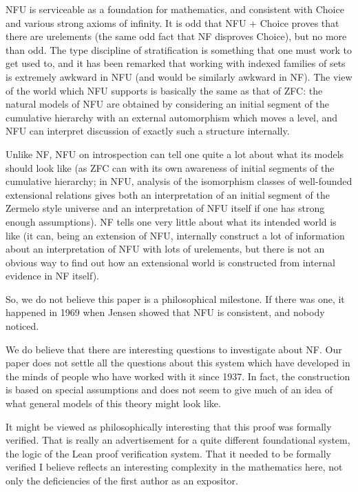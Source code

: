 \documentclass{article}
\theoremstyle{definition}
\theoremstyle{remark}
\begin{document}
NFU is serviceable as a foundation for mathematics, and consistent with Choice and various strong axioms of infinity.  It is odd that NFU + Choice proves that there are urelements (the same odd fact that NF disproves Choice), but no more than odd.
The type discipline of stratification is something that one must work to get used to, and it has been remarked that working with indexed families of sets is extremely awkward in NFU (and would be similarly awkward in NF).  The view of the world which NFU supports is basically the same as that of ZFC:  the natural models of NFU are obtained by considering an initial segment of the cumulative hierarchy with an external automorphism which moves a level, and NFU can interpret discussion of exactly such a structure internally.

Unlike NF, NFU on introspection can tell one quite a lot about what its models should look like (as ZFC can with its own awareness of initial segments of the cumulative hierarchy; in NFU, analysis of the isomorphism classes of well-founded extensional relations gives both an interpretation of an initial segment of the Zermelo style universe and an interpretation of NFU itself if one has strong enough assumptions).    NF tells one very little about what its intended world is like (it can, being an extension of NFU, internally construct a lot of information about an interpretation of NFU with lots of urelements, but there is not an obvious way to find out how an extensional world is constructed from internal evidence in NF itself).

So, we do not believe this paper is a philosophical milestone.  If there was one, it happened in 1969 when Jensen showed that NFU is consistent, and nobody noticed.

We do believe that there are interesting questions to investigate about NF.  Our paper does not settle all the questions about this system which have developed in the minds of people who have worked with it since 1937.  In fact, the construction is based on special assumptions  and does not seem to give much of an idea of what general models of this theory might look like.

It might be viewed as philosophically interesting that this proof was formally verified.  That is really an advertisement for a quite different foundational system, the logic of the Lean proof verification system.   That it needed to be formally verified I believe reflects an interesting complexity in the mathematics here, not only the deficiencies of the first author as an expositor.
\end{document}
